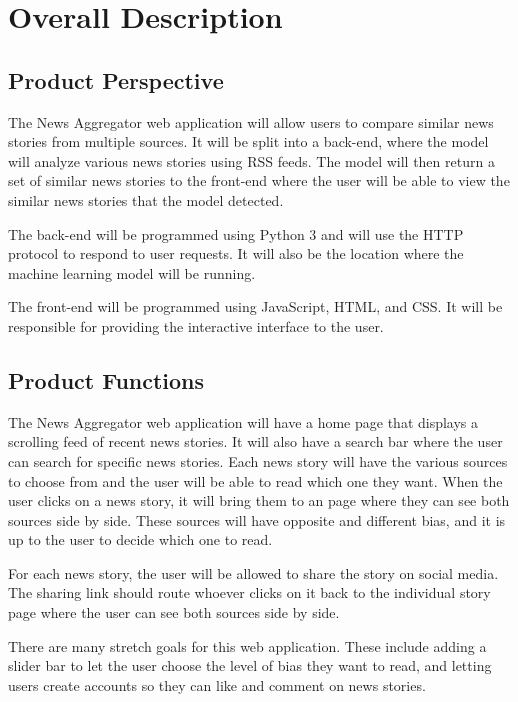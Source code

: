 \documentclass[onecolumn, draftclsnofoot,10pt, compsoc]{IEEEtran}
\begin{document}
\section{Overall Description}
\subsection{Product Perspective}
The News Aggregator web application will allow users to compare similar news stories from multiple sources. It will be split into a back-end, where the model will analyze various news stories using RSS feeds. The model will then return a set of similar news stories to the front-end where the user will be able to view the similar news stories that the model detected.\par
The back-end will be programmed using Python 3 and will use the HTTP protocol to respond to user requests. It will also be the location where the machine learning model will be running.\par
The front-end will be programmed using JavaScript, HTML, and CSS. It will be responsible for providing the interactive interface to the user.
\subsection{Product Functions}
The News Aggregator web application will have a home page that displays a scrolling feed of recent news stories. It will also have a search bar where the user can search for specific news stories. Each news story will have the various sources to choose from and the user will be able to read which one they want. When the user clicks on a news story, it will bring them to an page where they can see both sources side by side. These sources will have opposite and different bias, and it is up to the user to decide which one to read.\par
For each news story, the user will be allowed to share the story on social media. The sharing link should route whoever clicks on it back to the individual story page where the user can see both sources side by side.\par
There are many stretch goals for this web application. These include adding a slider bar to let the user choose the level of bias they want to read, and letting users create accounts so they can like and comment on news stories.
\end{document}
